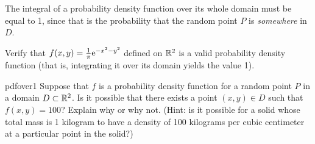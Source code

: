 \documentclass[prettycode,shellescape]{watsonbook}
\begin{document}
The integral of a probability density function over its whole domain
must be equal to 1, since that is the probability that the random
point $P$ is \textit{somewhere} in $D$. 

\begin{exercise}{}{}
  Verify that $f(x,y) = \frac{1}{\pi} \mathrm{e}^{-x^2 - y^2}$ defined on
  $\mathbb{R}^2$ is a valid probability density function (that is, integrating
  it over its domain yields the value 1).
\end{exercise}

\begin{exercise}{}{pdfover1}
  Suppose that $f$ is a probability density function for a random
  point $P$ in a domain $D\subset \mathbb{R}^2$. Is it possible that there
  exists a point $(x,y) \in D$ such that $f(x,y) = 100$? Explain why
  or why not. (Hint: is it possible for a solid whose total mass is 1
  kilogram to have a density of 100 kilograms per cubic centimeter at
  a particular point in the solid?)
\end{exercise}
\end{document}
